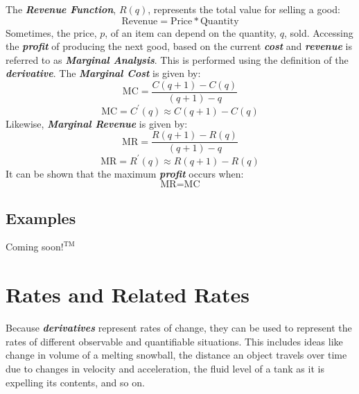\vspace{0.1in}
The \textbf{\textit{Revenue Function}}, $R(q)$, represents the total value for selling a good:
%
\begin{equation}
\text{Revenue} = \text{Price} * \text{Quantity}
\end{equation}
%
Sometimes, the price, $p$, of an item can depend on the quantity, $q$, sold. Accessing the \textbf{\textit{profit}} of producing the next good, based on the current \textbf{\textit{cost}} and \textbf{\textit{revenue}} is referred to as \textbf{\textit{Marginal Analysis}}. This is performed using the definition of the \textbf{\textit{derivative}}. The \textbf{\textit{Marginal Cost}} is given by:
%
\begin{equation}
\text{MC} = \frac{C(q+1) - C(q)}{(q+1) - q}
\end{equation}
%
\begin{equation}
\nonumber
\text{MC} = C^\prime(q) \approx C(q+1) - C(q)
\end{equation}
%
Likewise, \textbf{\textit{Marginal Revenue}} is given by:
%
\begin{equation}
\text{MR} = \frac{R(q+1) - R(q)}{(q+1) - q}
\end{equation}
%
\begin{equation}
\nonumber
\text{MR} = R^\prime(q) \approx R(q+1) - R(q)
\end{equation}
%
It can be shown that the maximum \textbf{\textit{profit}} occurs when:
%
\begin{equation}
\text{MR}= \text{MC}
\end{equation}

\begin{center}
\section*{\small Examples}
Coming soon$!^{\text{TM}}$
\end{center}

\section{Rates and Related Rates}
Because \textbf{\textit{derivatives}} represent rates of change, they can be used to represent the rates of different observable and quantifiable situations. This includes ideas like change in volume of a melting snowball, the distance an object travels over time due to changes in velocity and acceleration, the fluid level of a tank as it is expelling its contents, and so on.

